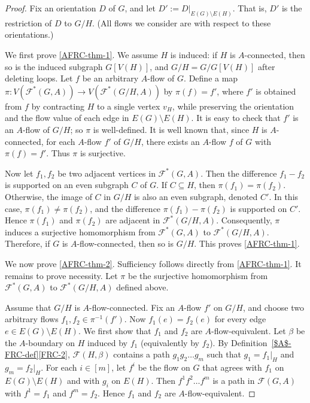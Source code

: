 \documentclass[a4paper,12pt]{article}
\theoremstyle{plain}
\theoremstyle{definition}
\newcommand\F{\mathcal{F}}
\begin{document}
\begin{proof}
Fix an orientation $D$ of $G$, and let $D':= D|_{E(G)\setminus E(H)}$.
That is, $D'$ is
the restriction of $D$ to $G/H$. 
(All flows we consider are with respect to these orientations.)

We first prove \ref{AFRC-thm-1}. We assume $H$ is induced: if $H$ is $A$-connected, then so is the induced subgraph $G[V(H)]$, and $G/H = G/G[V(H)]$ after deleting loops. 
Let $f$ be an arbitrary $A$-flow of $G$. Define a map $\pi: V(\F^*(G,A)) \to V(\F^*(G/H,A))$ by $\pi(f) = f'$, where $f'$ is obtained from $f$ by contracting $H$ to a single vertex $v_H$, while preserving the orientation and the flow value of each edge in $E(G) \setminus E(H)$. It is easy to check that $f'$ is an $A$-flow of $G/H$; so $\pi$ is well-defined.
%
It is well known that, since $H$ is $A$-connected, for each $A$-flow $f'$ of $G/H$, there exists an $A$-flow $f$ of $G$ with $\pi(f) = f'$. Thus $\pi$ is surjective.  

Now let $f_1, f_2$ be two adjacent vertices in $\F^*(G,A)$. Then the difference $f_1 - f_2$ is supported on an even subgraph $C$ of $G$. If $C \subseteq H$, then $\pi(f_1) = \pi(f_2)$. Otherwise, the image of $C$ in $G/H$ is also an even subgraph, denoted $C'$. In this case, $\pi(f_1) \neq \pi(f_2)$, and the difference $\pi(f_1) - \pi(f_2)$ is supported on $C'$. Hence $\pi(f_1)$ and $\pi(f_2)$ are adjacent in $\F^*(G/H, A)$. Consequently, $\pi$ induces a surjective homomorphism from $\F^*(G,A)$ to $\F^*(G/H, A)$. Therefore, if $G$ is $A$-flow-connected, then so is $G/H$. This proves \ref{AFRC-thm-1}.

We now prove \ref{AFRC-thm-2}. Sufficiency follows directly from \ref{AFRC-thm-1}. It remains to prove necessity. Let $\pi$ be the surjective homomorphism from $\F^*(G,A)$ to $\F^*(G/H,A)$ defined above.

Assume that $G/H$ is $A$-flow-connected. Fix an $A$-flow $f'$ on $G/H$, and choose two arbitrary flows $f_1, f_2 \in \pi^{-1}(f')$. Now $f_1(e) = f_2(e)$ for every edge $e \in E(G) \setminus E(H)$. We first show that $f_1$ and $f_2$ are $A$-flow-equivalent. Let $\beta$ be the $A$-boundary on $H$ induced by $f_1$ (equivalently by $f_2$). By Definition~\ref{$A$-FRC-def}\ref{FRC-2}, $\mathcal{F}(H,\beta)$ contains a path $g_1 g_2 \dots g_m$ such that $g_1 = f_1|_H$ and $g_m = f_2|_H$. For each $i \in [m]$, let $f^i$ be the flow on $G$ that agrees with $f_1$ on $E(G) \setminus E(H)$ and with $g_i$ on $E(H)$. Then $f^1 f^2 \dots f^m$ is a path in $\mathcal{F}(G,A)$ with $f^1 = f_1$ and $f^m = f_2$. Hence $f_1$ and $f_2$ are $A$-flow-equivalent.


\end{proof}
\end{document}
